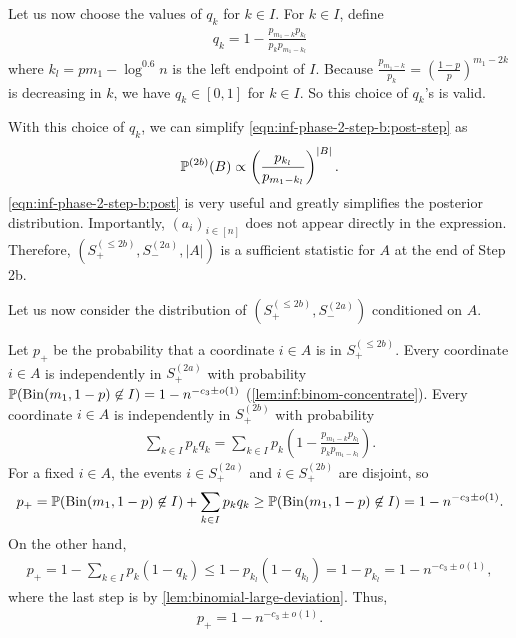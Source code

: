 Let us now choose the values of $q_k$ for $k\in I$.
For $k\in I$, define
\begin{align*}
  q_k = 1-\frac{p_{m_1-k} p_{k_l}}{p_k p_{m_1-k_l}}
\end{align*}
where $k_l=p m_1 - \log^{0.6}n$ is the left endpoint of $I$.
Because $\frac{p_{m_1-k}}{p_k} = \left(\frac{1-p}p\right)^{m_1-2k}$ is decreasing in $k$, we have $q_k\in [0, 1]$ for $k\in I$.
So this choice of $q_k$'s is valid.

With this choice of $q_k$, we can simplify \cref{eqn:inf-phase-2-step-b:post-step} as
\begin{align} \label{eqn:inf-phase-2-step-b:post}
  \mathbb{P}^{(2b)}(B) \propto \left(\frac{p_{k_l}}{p_{m_1-k_l}}\right)^{|B|}.
\end{align}
\cref{eqn:inf-phase-2-step-b:post} is very useful and greatly simplifies the posterior distribution.
Importantly, $(a_i)_{i\in [n]}$ does not appear directly in the expression.
Therefore, $\left(S^{(\le 2b)}_+, S^{(2a)}_-, |A|\right)$ is a sufficient statistic for $A$ at the end of Step 2b.

Let us now consider the distribution of $\left(S^{(\le 2b)}_+, S^{(2a)}_-\right)$ conditioned on $A$.

Let $p_+$ be the probability that a coordinate $i\in A$ is in $S^{(\le 2b)}_+$.
Every coordinate $i\in A$ is independently in $S^{(2a)}_+$ with probability $\mathbb{P}(\operatorname{\mathrm{Bin}}(m_1,1-p)\not \in I) = 1-n^{-c_3\pm o(1)}$ (\cref{lem:inf:binom-concentrate}).
Every coordinate $i\in A$ is independently in $S^{(2b)}_+$ with probability
\begin{align*}
  \sum_{k\in I} p_k q_k = \sum_{k\in I} p_k \left(1-\frac{p_{m_1-k} p_{k_l}}{p_k p_{m_1-k_l}}\right).
\end{align*}
For a fixed $i\in A$, the events $i\in S^{(2a)}_+$ and $i\in S^{(2b)}_+$ are disjoint, so
\begin{align*}
  p_+ = \mathbb{P}(\operatorname{\mathrm{Bin}}(m_1,1-p)\not \in I) + \sum_{k\in I} p_k q_k \ge \mathbb{P}(\operatorname{\mathrm{Bin}}(m_1,1-p)\not \in I) =  1-n^{-c_3\pm o(1)}.
\end{align*}
On the other hand,
\begin{align*}
  p_+ = 1 - \sum_{k\in I} p_k (1 - q_k) \le 1 - p_{k_l} (1 - q_{k_l}) = 1 - p_{k_l} = 1-n^{-c_3\pm o(1)},
\end{align*}
where the last step is by \cref{lem:binomial-large-deviation}.
Thus,
\begin{align} \label{eqn:inf-p-plus}
    p_+ = 1-n^{-c_3\pm o(1)}.
\end{align}

